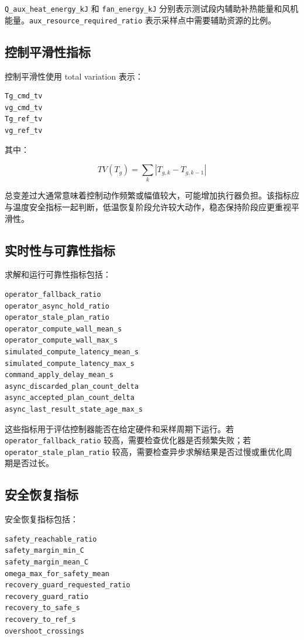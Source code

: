 \documentclass[UTF8,openany,zihao=-4,oneside]{ctexbook}
\providecommand{\passthrough}[1]{#1}
\begin{document}
\passthrough{\lstinline!Q_aux_heat_energy_kJ!} 和 \passthrough{\lstinline!fan_energy_kJ!} 分别表示测试段内辅助补热能量和风机能量。\passthrough{\lstinline!aux_resource_required_ratio!} 表示采样点中需要辅助资源的比例。

\subsection{控制平滑性指标}\label{subsec:smoothness-metrics}

控制平滑性使用 total variation 表示：

\begin{lstlisting}
Tg_cmd_tv
vg_cmd_tv
Tg_ref_tv
vg_ref_tv
\end{lstlisting}

其中：

\[
TV(T_g)=\sum_k\left|T_{g,k}-T_{g,k-1}\right|
\]

总变差过大通常意味着控制动作频繁或幅值较大，可能增加执行器负担。该指标应与温度安全指标一起判断，低温恢复阶段允许较大动作，稳态保持阶段应更重视平滑性。

\subsection{实时性与可靠性指标}\label{subsec:runtime-reliability-metrics}

求解和运行可靠性指标包括：

\begin{lstlisting}
operator_fallback_ratio
operator_async_hold_ratio
operator_stale_plan_ratio
operator_compute_wall_mean_s
operator_compute_wall_max_s
simulated_compute_latency_mean_s
simulated_compute_latency_max_s
command_apply_delay_mean_s
async_discarded_plan_count_delta
async_accepted_plan_count_delta
async_last_result_state_age_max_s
\end{lstlisting}

这些指标用于评估控制器能否在给定硬件和采样周期下运行。若 \passthrough{\lstinline!operator_fallback_ratio!} 较高，需要检查优化器是否频繁失败；若 \passthrough{\lstinline!operator_stale_plan_ratio!} 较高，需要检查异步求解结果是否过慢或重优化周期是否过长。

\subsection{安全恢复指标}\label{subsec:recovery-metrics}

安全恢复指标包括：

\begin{lstlisting}
safety_reachable_ratio
safety_margin_min_C
safety_margin_mean_C
omega_max_for_safety_mean
recovery_guard_requested_ratio
recovery_guard_ratio
recovery_to_safe_s
recovery_to_ref_s
overshoot_crossings
\end{lstlisting}
\end{document}
